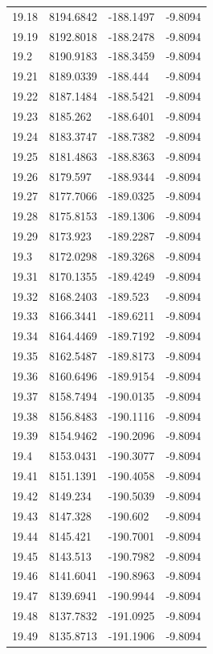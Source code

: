 \begin{table}[H]
\begin{tabular}{llll}
19.18 & 8194.6842 & -188.1497 & -9.8094 \\
19.19 & 8192.8018 & -188.2478 & -9.8094 \\
19.2 & 8190.9183 & -188.3459 & -9.8094 \\
19.21 & 8189.0339 & -188.444 & -9.8094 \\
19.22 & 8187.1484 & -188.5421 & -9.8094 \\
19.23 & 8185.262 & -188.6401 & -9.8094 \\
19.24 & 8183.3747 & -188.7382 & -9.8094 \\
19.25 & 8181.4863 & -188.8363 & -9.8094 \\
19.26 & 8179.597 & -188.9344 & -9.8094 \\
19.27 & 8177.7066 & -189.0325 & -9.8094 \\
19.28 & 8175.8153 & -189.1306 & -9.8094 \\
19.29 & 8173.923 & -189.2287 & -9.8094 \\
19.3 & 8172.0298 & -189.3268 & -9.8094 \\
19.31 & 8170.1355 & -189.4249 & -9.8094 \\
19.32 & 8168.2403 & -189.523 & -9.8094 \\
19.33 & 8166.3441 & -189.6211 & -9.8094 \\
19.34 & 8164.4469 & -189.7192 & -9.8094 \\
19.35 & 8162.5487 & -189.8173 & -9.8094 \\
19.36 & 8160.6496 & -189.9154 & -9.8094 \\
19.37 & 8158.7494 & -190.0135 & -9.8094 \\
19.38 & 8156.8483 & -190.1116 & -9.8094 \\
19.39 & 8154.9462 & -190.2096 & -9.8094 \\
19.4 & 8153.0431 & -190.3077 & -9.8094 \\
19.41 & 8151.1391 & -190.4058 & -9.8094 \\
19.42 & 8149.234 & -190.5039 & -9.8094 \\
19.43 & 8147.328 & -190.602 & -9.8094 \\
19.44 & 8145.421 & -190.7001 & -9.8094 \\
19.45 & 8143.513 & -190.7982 & -9.8094 \\
19.46 & 8141.6041 & -190.8963 & -9.8094 \\
19.47 & 8139.6941 & -190.9944 & -9.8094 \\
19.48 & 8137.7832 & -191.0925 & -9.8094 \\
19.49 & 8135.8713 & -191.1906 & -9.8094 \\

\end{tabular}
\end{table}
